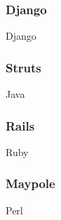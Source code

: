 \subsubsection{Django}
Django 

\subsubsection{Struts}
Java

\subsubsection{Rails}
Ruby

\subsubsection{Maypole}
Perl




